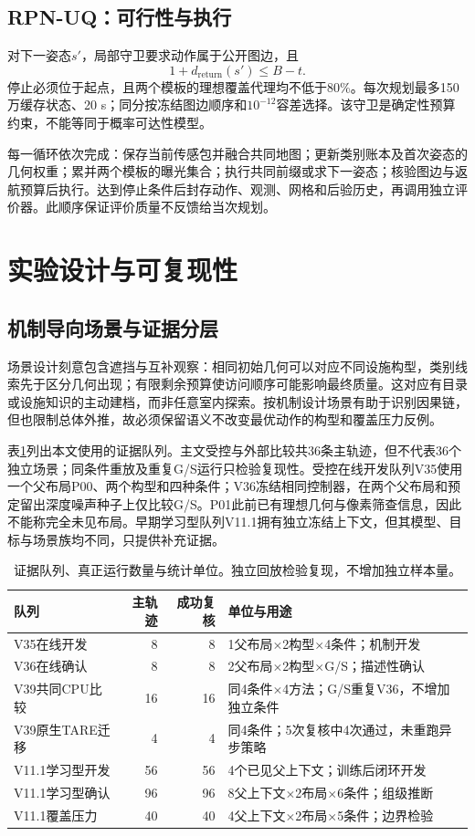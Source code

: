 \documentclass[11pt,a4paper]{article}
\begin{document}
\subsection{RPN-UQ：可行性与执行}
对下一姿态$s'$，局部守卫要求动作属于公开图边，且
\begin{equation}
1+d_{\mathrm{return}}(s')\le B-t.
\end{equation}
停止必须位于起点，且两个模板的理想覆盖代理均不低于80\%。每次规划最多150万缓存状态、20 s；同分按冻结图边顺序和$10^{-12}$容差选择。该守卫是确定性预算约束，不能等同于概率可达性模型。

每一循环依次完成：保存当前传感包并融合共同地图；更新类别账本及首次姿态的几何权重；累并两个模板的曝光集合；执行共同前缀或求下一姿态；核验图边与返航预算后执行。达到停止条件后封存动作、观测、网格和后验历史，再调用独立评价器。此顺序保证评价质量不反馈给当次规划。

\section{实验设计与可复现性}
\subsection{机制导向场景与证据分层}
场景设计刻意包含遮挡与互补观察：相同初始几何可以对应不同设施构型，类别线索先于区分几何出现；有限剩余预算使访问顺序可能影响最终质量。这对应有目录或设施知识的主动建档，而非任意室内探索。按机制设计场景有助于识别因果链，但也限制总体外推，故必须保留语义不改变最优动作的构型和覆盖压力反例。

表\ref{tab:cohorts}列出本文使用的证据队列。主文受控与外部比较共36条主轨迹，但不代表36个独立场景；同条件重放及重复G/S运行只检验复现性。受控在线开发队列V35使用一个父布局P00、两个构型和四种条件；V36冻结相同控制器，在两个父布局和预定留出深度噪声种子上仅比较G/S。P01此前已有理想几何与像素筛查信息，因此不能称完全未见布局。早期学习型队列V11.1拥有独立冻结上下文，但其模型、目标与场景族均不同，只提供补充证据。

\begin{table}[tb]
\centering\small
\caption{证据队列、真正运行数量与统计单位。独立回放检验复现，不增加独立样本量。}
\label{tab:cohorts}
\begin{tabular}{p{.24\linewidth}rrp{.37\linewidth}}
\toprule
队列 & 主轨迹 & 成功复核 & 单位与用途\\\midrule
V35在线开发 & 8 & 8 & 1父布局$\times$2构型$\times$4条件；机制开发\\
V36在线确认 & 8 & 8 & 2父布局$\times$2构型$\times$G/S；描述性确认\\
V39共同CPU比较 & 16 & 16 & 同4条件$\times$4方法；G/S重复V36，不增加独立条件\\
V39原生TARE迁移 & 4 & 4 & 同4条件；5次复核中4次通过，未重跑异步策略\\
V11.1学习型开发 & 56 & 56 & 4个已见父上下文；训练后闭环开发\\
V11.1学习型确认 & 96 & 96 & 8父上下文$\times$2布局$\times$6条件；组级推断\\
V11.1覆盖压力 & 40 & 40 & 4父上下文$\times$2布局$\times$5条件；边界检验\\\bottomrule
\end{tabular}
\end{table}
\end{document}

